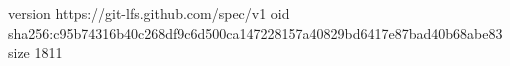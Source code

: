 version https://git-lfs.github.com/spec/v1
oid sha256:c95b74316b40c268df9c6d500ca147228157a40829bd6417e87bad40b68abe83
size 1811
